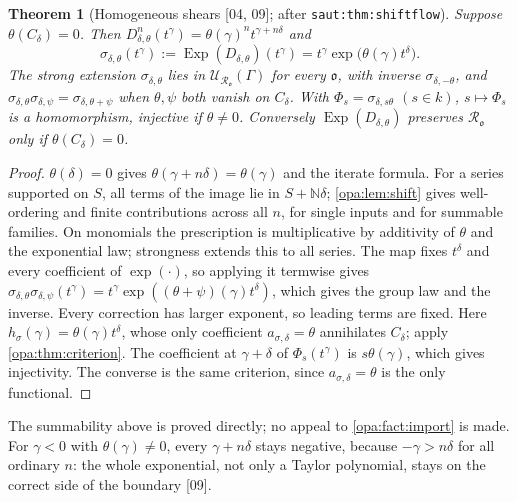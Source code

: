 \documentclass[11pt,oneside]{article}
\numberwithin{equation}{section}
\newtheorem{theorem}{Theorem}[section]
\theoremstyle{definition}
\theoremstyle{remark}
\newcommand{\N}{\mathbb N}
\newcommand{\oo}{\mathfrak o}
\newcommand{\Ro}{\mathcal R_{\oo}}
\newcommand{\UU}{\mathcal U}
\newcommand{\Exp}{\operatorname{Exp}}
\newcommand{\src}[1]{\textup{\textsf{\small[#1]}}}
\newcommand{\lbl}[1]{\nolinkurl{#1}}
\begin{document}
\begin{theorem}[Homogeneous shears \src{04, 09}; after \lbl{saut:thm:shiftflow}]\label{opa:thm:shear}
Suppose $\theta(C_\delta)=0$. Then
$D_{\delta,\theta}^n(t^\gamma)=\theta(\gamma)^nt^{\gamma+n\delta}$ and
\begin{equation}\label{opa:eq:shear}
 \sigma_{\delta,\theta}(t^\gamma):=\Exp(D_{\delta,\theta})(t^\gamma)
 =t^\gamma\exp\bigl(\theta(\gamma)t^\delta\bigr).
\end{equation}
The strong extension $\sigma_{\delta,\theta}$ lies in $\UU_{\Ro}(\Gamma)$ for every
$\oo$, with inverse $\sigma_{\delta,-\theta}$, and
$\sigma_{\delta,\theta}\sigma_{\delta,\psi}=\sigma_{\delta,\theta+\psi}$ when
$\theta,\psi$ both vanish on $C_\delta$. With $\Phi_s=\sigma_{\delta,s\theta}$
$(s\in k)$, $s\mapsto\Phi_s$ is a homomorphism, injective if $\theta\ne0$.
Conversely $\Exp(D_{\delta,\theta})$ preserves $\Ro$ only if
$\theta(C_\delta)=0$.
\end{theorem}
\begin{proof}
$\theta(\delta)=0$ gives $\theta(\gamma+n\delta)=\theta(\gamma)$ and the iterate
formula. For a series supported on $S$, all terms of the image lie in
$S+\N\delta$; \cref{opa:lem:shift} gives well-ordering and finite
contributions across all $n$, for single inputs and for summable families.
On monomials the prescription is multiplicative by additivity of $\theta$ and
the exponential law; strongness extends this to all series. The map fixes
$t^\delta$ and every coefficient of $\exp(\cdot)$, so applying it termwise gives
$\sigma_{\delta,\theta}\sigma_{\delta,\psi}(t^\gamma)=t^\gamma\exp((\theta+\psi)(\gamma)
t^\delta)$, which gives the group law and the inverse. Every correction has
larger exponent, so leading terms are fixed. Here $h_\sigma(\gamma)=\theta(\gamma)
t^\delta$, whose only coefficient $a_{\sigma,\delta}=\theta$ annihilates
$C_\delta$; apply \cref{opa:thm:criterion}. The coefficient at $\gamma+\delta$
of $\Phi_s(t^\gamma)$ is $s\theta(\gamma)$, which gives injectivity. The converse
is the same criterion, since $a_{\sigma,\delta}=\theta$ is the only functional.
\end{proof}

The summability above is proved directly; no appeal to
\cref{opa:fact:import} is made. For $\gamma<0$ with $\theta(\gamma)\ne0$, every
$\gamma+n\delta$ stays negative, because $-\gamma>n\delta$ for all ordinary $n$:
the whole exponential, not only a Taylor polynomial, stays on the correct side
of the boundary \src{09}.
\end{document}
